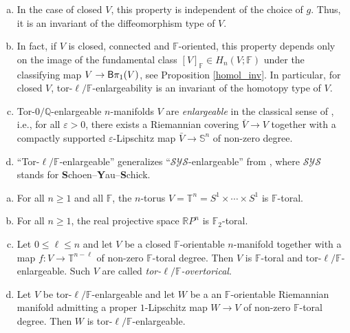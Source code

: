 \documentclass[pdftex]{sigma}
\numberwithin{equation}{section}
\newcommand{\F}{\mathbb{F}}
\newcommand{\SSS}{\mathbb{S}}
\newcommand{\TTT}{\mathbb{T}}
\newcommand{\eps}{\varepsilon}
\begin{document}
\begin{Remark}\quad
\begin{enumerate}[(a)]\itemsep=0pt
\item In the case of closed $V$, this property is independent of the choice of $g$.
Thus, it is an invariant of the diffeomorphism type of $V$.
\item In fact, if $V$ is closed, connected and $\F$-oriented, this property depends only on the image of the fundamental class $[V]_\F \in H_n(V; \F)$ under the classifying map $V \to {\sf B}\pi_1(V)$, see Proposition \ref{homol_inv}.
In particular, for closed $V$, tor-$\ell/\F$-enlargeability is an invariant of the homotopy type of $V$.
\item Tor-$0/ \mathbb{Q}$-enlargeable $n$-manifolds $V$ are {\em enlargeable} in the classical sense of \cite[Section 5]{G-L1983}, i.e., for all $\eps > 0$, there exists a Riemannian covering $\bar V \to V$ together with a compactly supported $\eps$-Lipschitz map $\bar V \to \SSS^n$ of non-zero degree.
\item ``Tor-$\ell/\F$-enlargeable'' generalizes ``$\mathcal{SYS}$-enlargeable'' from \cite{Gr2018}, where $\mathcal{SYS}$ stands for \textbf Schoen--\textbf Yau--\textbf Schick.
\end{enumerate}
\end{Remark}

\begin{Example} \label{ex:toral}\quad
\begin{enumerate}[(a)]\itemsep=0pt
\item \label{eins} For all $n \geq 1$ and all $\F$, the $n$-torus $V = \TTT^n = S^1 \times \cdots \times S^1$ is $\F$-toral.
\item \label{projspace} For all $n \geq 1$, the real projective space $\mathbb{R} P^n$ is $\F_2$-toral.
\item \label{ex:overtorical} Let $0 \leq \ell \leq n$ and let $V$ be a closed $\F$-orientable $n$-manifold together with a map $f \colon V \to {\TTT}^{n-\ell}$ of non-zero $\F$-toral degree.
Then $V$ is $\F$-toral and tor-$\ell/\F$-enlargeable.
Such $V$ are called {\em tor-$\ell/\F$-overtorical}.
\item Let $V$ be tor-$\ell / \F$-enlargeable and let $W$ be a an $\F$-orientable Riemannian manifold admitting a proper $1$-Lipschitz map $W \to V$ of non-zero $\F$-toral degree.
Then $W$ is tor-$\ell/\F$-enlargeable.
\end{enumerate}
\end{Example}
\end{document}
